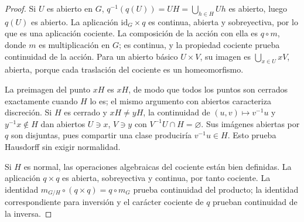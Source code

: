 \begin{proof}
Si $U$ es abierto en $G$, $q^{-1}(q(U))=UH=\bigcup_{h\in H}Uh$ es abierto, luego $q(U)$ es abierto. La aplicación $\mathrm{id}_G\times q$ es continua, abierta y sobreyectiva, por lo que es una aplicación cociente. La composición de la acción con ella es $q\circ m$, donde $m$ es multiplicación en $G$; es continua, y la propiedad cociente prueba continuidad de la acción. Para un abierto básico $U\times V$, su imagen es $\bigcup_{x\in U}xV$, abierta, porque cada traslación del cociente es un homeomorfismo.

La preimagen del punto $xH$ es $xH$, de modo que todos los puntos son cerrados exactamente cuando $H$ lo es; el mismo argumento con abiertos caracteriza discreción. Si $H$ es cerrado y $xH\ne yH$, la continuidad de $(u,v)\mapsto v^{-1}u$ y $y^{-1}x\notin H$ dan abiertos $U\ni x$, $V\ni y$ con $V^{-1}U\cap H=\varnothing$. Sus imágenes abiertas por $q$ son disjuntas, pues compartir una clase produciría $v^{-1}u\in H$. Esto prueba Hausdorff sin exigir normalidad.

Si $H$ es normal, las operaciones algebraicas del cociente están bien definidas. La aplicación $q\times q$ es abierta, sobreyectiva y continua, por tanto cociente. La identidad $m_{G/H}\circ(q\times q)=q\circ m_G$ prueba continuidad del producto; la identidad correspondiente para inversión y el carácter cociente de $q$ prueban continuidad de la inversa.
\end{proof}

